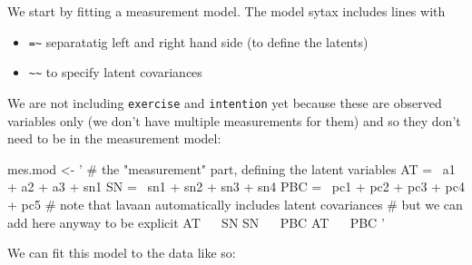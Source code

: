 \documentclass[]{article}
\newenvironment{Shaded}{\begin{snugshade}}{\end{snugshade}}
\newcommand{\StringTok}[1]{\textcolor[rgb]{0.31,0.60,0.02}{#1}}
\newcommand{\NormalTok}[1]{#1}
\providecommand{\tightlist}{%
  \setlength{\itemsep}{0pt}\setlength{\parskip}{0pt}}
\theoremstyle{definition}
\theoremstyle{definition}
\theoremstyle{definition}
\theoremstyle{remark}
\begin{document}
We start by fitting a measurement model. The model sytax includes lines
with

\begin{itemize}
\tightlist
\item
  \texttt{=\textasciitilde{}} separatatig left and right hand side (to
  define the latents)
\item
  \texttt{\textasciitilde{}\textasciitilde{}} to specify latent
  covariances
\end{itemize}

We are not including \texttt{exercise} and \texttt{intention} yet
because these are observed variables only (we don't have multiple
measurements for them) and so they don't need to be in the measurement
model:

\begin{Shaded}
\begin{Highlighting}[]
\NormalTok{mes.mod <-}\StringTok{ ' }
\StringTok{  # the "measurement" part, defining the latent variables}
\StringTok{  AT =~ a1 + a2 + a3 + sn1}
\StringTok{  SN =~ sn1 + sn2 + sn3 + sn4}
\StringTok{  PBC =~ pc1 + pc2 + pc3 + pc4 + pc5}
\StringTok{  }
\StringTok{  # note that lavaan automatically includes latent covariances}
\StringTok{  # but we can add here anyway to be explicit}
\StringTok{  AT ~~ SN}
\StringTok{  SN ~~ PBC}
\StringTok{  AT ~~ PBC}
\StringTok{'}  
\end{Highlighting}
\end{Shaded}

We can fit this model to the data like so:
\end{document}
